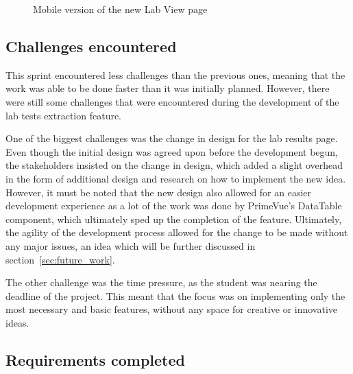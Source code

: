 \FloatBarrier{}

\begin{figure}[ht]
  \centering
  \hfill
  \caption{Mobile version of the new Lab View page}\label{fig:labs_page_mobile}
\end{figure}

\FloatBarrier{}


\subsection{Challenges encountered}

This sprint encountered less challenges than the previous ones, meaning that the work was able to be done faster than it was initially planned. However, there were still some challenges that were encountered during the development of the lab tests extraction feature.

One of the biggest challenges was the change in design for the lab results page. Even though the initial design was agreed upon before the development begun, the stakeholders insisted on the change in design, which added a slight overhead in the form of additional design and research on how to implement the new idea. However, it must be noted that the new design also allowed for an easier development experience as a lot of the work was done by PrimeVue's DataTable component, which ultimately sped up the completion of the feature. Ultimately, the agility of the development process allowed for the change to be made without any major issues, an idea which will be further discussed in section~\ref{sec:future_work}.

The other challenge was the time pressure, as the student was nearing the deadline of the project. This meant that the focus was on implementing only the most necessary and basic features, without any space for creative or innovative ideas.

\subsection{Requirements completed}


